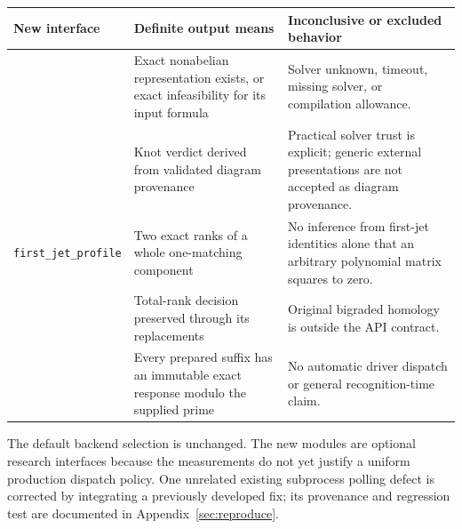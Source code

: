 \begin{center}\small
\begin{tabularx}{\textwidth}{@{}p{}YY@{}}
\toprule
New interface & Definite output means & Inconclusive or excluded behavior\\
\midrule
{} & Exact nonabelian representation exists, or exact infeasibility for its input formula & Solver unknown, timeout, missing solver, or compilation allowance.\\
 & Knot verdict derived from validated diagram provenance & Practical solver trust is explicit; generic external presentations are not accepted as diagram provenance.\\
\texttt{first\_jet\_profile} & Two exact ranks of a whole one-matching component & No inference from first-jet identities alone that an arbitrary polynomial matrix squares to zero.\\
 & Total-rank decision preserved through its replacements & Original bigraded homology is outside the API contract.\\
 & Every prepared suffix has an immutable exact response modulo the supplied prime & No automatic driver dispatch or general recognition-time claim.\\
\bottomrule
\end{tabularx}\end{center}

The default backend selection is unchanged. The new modules are optional
research interfaces because the measurements do not yet justify a uniform
production dispatch policy. One unrelated existing subprocess polling
defect is corrected by integrating a previously developed fix; its
provenance and regression test are documented in Appendix~\ref{sec:reproduce}.
